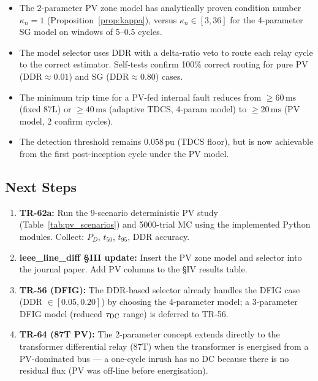 \documentclass[11pt, a4paper]{article}
\newcommand{\pu}{\,\text{pu}}
\newcommand{\ms}{\,\text{ms}}
\newcommand{\kn}{\kappa_n}
\begin{document}
\begin{itemize}
  \item The 2-parameter PV zone model has analytically proven condition number
    $\kn = 1$ (Proposition~\ref{prop:kappa}), versus $\kn \in [3, 36]$ for the
    4-parameter SG model on windows of 5--0.5 cycles.

  \item The model selector uses DDR with a delta-ratio veto to route each
    relay cycle to the correct estimator.  Self-tests confirm 100\% correct
    routing for pure PV (DDR$\approx 0.01$) and SG (DDR$\approx 0.80$) cases.

  \item The minimum trip time for a PV-fed internal fault reduces from
    $\geq 60\ms$ (fixed 87L) or $\geq 40\ms$ (adaptive TDCS, 4-param model)
    to $\geq 20\ms$ (PV model, 2 confirm cycles).

  \item The detection threshold remains $0.058\pu$ (TDCS floor), but is now
    achievable from the first post-inception cycle under the PV model.
\end{itemize}

\subsection{Next Steps}

\begin{enumerate}
  \item \textbf{TR-62a:}  Run the 9-scenario deterministic PV study
    (Table~\ref{tab:pv_scenarios}) and 5000-trial MC using the implemented
    Python modules.  Collect: $P_D$, $t_{50}$, $t_{95}$, DDR accuracy.

  \item \textbf{ieee\_line\_diff §III update:}  Insert the PV zone model and
    selector into the journal paper.  Add PV columns to the §IV results table.

  \item \textbf{TR-56 (DFIG):}  The DDR-based selector already handles the
    DFIG case (DDR $\in [0.05, 0.20]$) by choosing the 4-parameter model;
    a 3-parameter DFIG model (reduced $\tau_{\rm DC}$ range) is deferred to
    TR-56.

  \item \textbf{TR-64 (87T PV):}  The 2-parameter concept extends directly to
    the transformer differential relay (87T) when the transformer is energised
    from a PV-dominated bus — a one-cycle inrush has no DC because there is no
    residual flux (PV was off-line before energisation).
\end{enumerate}



\end{document}
